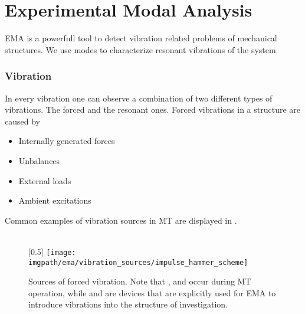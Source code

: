 \section{Experimental Modal Analysis}

\ac{EMA} is a powerfull tool to detect vibration related problems of mechanical structures. We use modes to characterize resonant vibrations of the system
\cite{schwarz1999experimental}


\subsubsection{Vibration}

In every vibration one can observe a combination of two different types of vibrations. The forced and the resonant ones. Forced vibrations in a structure are caused by
\begin{itemize}
    \item Internally generated forces
    \item Unbalances
    \item External loads
    \item Ambient excitations
\end{itemize}
Common examples of vibration sources in \ac{MT} are displayed in .

\begin{figure}[!htb]
    \centering
        \hspace{4em}
    \hspace{4em}
    \\[5ex]
    \begingroup
    [0.5\linewidth]{%
        \texttt{[image: \\imgpath/ema/vibration\_sources/impulse\_hammer\_scheme]}}
    \endgroup
    \hspace{0em}
    \caption[Forced Vibration Sources]{Sources of forced vibration. Note that ,  and  occur during \ac{MT} operation, while  and  are devices that are explicitly used for \ac{EMA} to introduce vibrations into the structure of investigation.}
    \label{fig:vibration_sources}
\end{figure}

